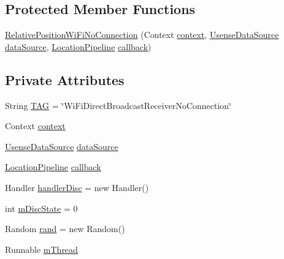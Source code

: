 \subsection*{Protected Member Functions}
\begin{DoxyCompactItemize}
\item 
\hyperlink{classcs_1_1usense_1_1location_1_1_relative_position_wi_fi_no_connection_ae95f15fa826025909d2d034f312cfbaa}{Relative\+Position\+Wi\+Fi\+No\+Connection} (Context \hyperlink{classcs_1_1usense_1_1location_1_1_relative_position_wi_fi_no_connection_add84c01c61a954f796fb267069699226}{context}, \hyperlink{classcs_1_1usense_1_1db_1_1_usense_data_source}{Usense\+Data\+Source} \hyperlink{classcs_1_1usense_1_1location_1_1_relative_position_wi_fi_no_connection_aeac4d1f5b88ffbaf64b8cde82f789647}{data\+Source}, \hyperlink{classcs_1_1usense_1_1location_1_1_location_pipeline}{Location\+Pipeline} \hyperlink{classcs_1_1usense_1_1location_1_1_relative_position_wi_fi_no_connection_ae8388a2458d1b4ec4c9e1d200c4b6ff6}{callback})
\end{DoxyCompactItemize}
\subsection*{Private Attributes}
\begin{DoxyCompactItemize}
\item 
String \hyperlink{classcs_1_1usense_1_1location_1_1_relative_position_wi_fi_no_connection_af9ae70af673210e1cc1a6c8e215b36a2}{T\+A\+G} = \char`\"{}Wi\+Fi\+Direct\+Broadcast\+Receiver\+No\+Connection\char`\"{}
\item 
Context \hyperlink{classcs_1_1usense_1_1location_1_1_relative_position_wi_fi_no_connection_add84c01c61a954f796fb267069699226}{context}
\item 
\hyperlink{classcs_1_1usense_1_1db_1_1_usense_data_source}{Usense\+Data\+Source} \hyperlink{classcs_1_1usense_1_1location_1_1_relative_position_wi_fi_no_connection_aeac4d1f5b88ffbaf64b8cde82f789647}{data\+Source}
\item 
\hyperlink{classcs_1_1usense_1_1location_1_1_location_pipeline}{Location\+Pipeline} \hyperlink{classcs_1_1usense_1_1location_1_1_relative_position_wi_fi_no_connection_ae8388a2458d1b4ec4c9e1d200c4b6ff6}{callback}
\item 
Handler \hyperlink{classcs_1_1usense_1_1location_1_1_relative_position_wi_fi_no_connection_a651d0eb8ab40a9aafc59a938acee143c}{handler\+Disc} = new Handler()
\item 
int \hyperlink{classcs_1_1usense_1_1location_1_1_relative_position_wi_fi_no_connection_a8d3612afa4159807065cacc3ac300ba9}{m\+Disc\+State} = 0
\item 
Random \hyperlink{classcs_1_1usense_1_1location_1_1_relative_position_wi_fi_no_connection_aba70fe571fbd9600ef45daeb6b8ff04a}{rand} = new Random()
\item 
Runnable \hyperlink{classcs_1_1usense_1_1location_1_1_relative_position_wi_fi_no_connection_ad2f797eb0aaa8e40db0ed90c3469d05d}{m\+Thread}
\end{DoxyCompactItemize}


